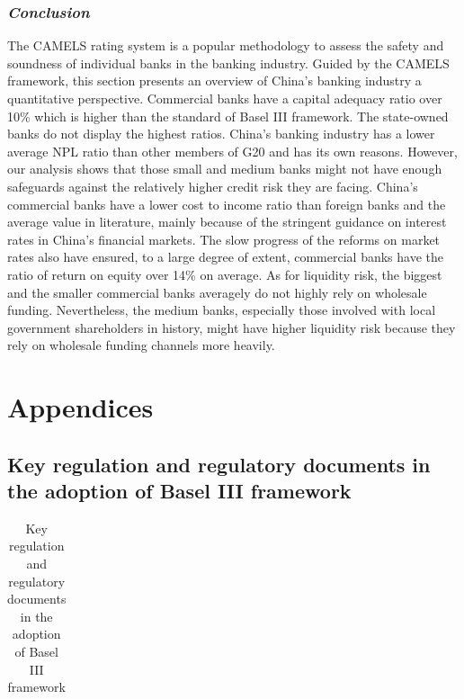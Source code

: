 \documentclass[
  12pt,
  a4paper,
]{scrreprt}
\begin{document}
{{{{\subsubsection{\texorpdfstring{\emph{Conclusion}}{Conclusion}}\label{conclusion}

The CAMELS rating system is a popular methodology to assess the safety
and soundness of individual banks in the banking industry. Guided by the
CAMELS framework, this section presents an overview of China's banking
industry a quantitative perspective. Commercial banks have a capital
adequacy ratio over 10\% which is higher than the standard of Basel III
framework. The state-owned banks do not display the highest ratios.
China's banking industry has a lower average NPL ratio than other
members of G20 and has its own reasons. However, our analysis shows that
those small and medium banks might not have enough safeguards against
the relatively higher credit risk they are facing. China's commercial
banks have a lower cost to income ratio than foreign banks and the
average value in literature, mainly because of the stringent guidance on
interest rates in China's financial markets. The slow progress of the
reforms on market rates also have ensured, to a large degree of extent,
commercial banks have the ratio of return on equity over 14\% on
average. As for liquidity risk, the biggest and the smaller commercial
banks averagely do not highly rely on wholesale funding. Nevertheless,
the medium banks, especially those involved with local government
shareholders in history, might have higher liquidity risk because they
rely on wholesale funding channels more heavily.

\section{Appendices}\label{appendices}

\subsection{Key regulation and regulatory documents in the adoption of
Basel III
framework}\label{key-regulation-and-regulatory-documents-in-the-adoption-of-basel-iii-framework}

\begin{longtable}[t]{l>{\raggedright\arraybackslash}p{6.5cm}>{\raggedright\arraybackslash}p{6.5cm}}

\caption{\label{tbl-regulatorydocs}Key regulation and regulatory
documents in the adoption of Basel III framework}


\end{longtable}}}}}
\end{document}
